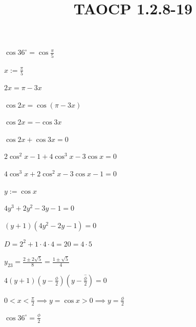 \documentclass{article}
\title{TAOCP 1.2.8\mbox{-}19}
\begin{document}
\maketitle

\( \cos 36^\circ = \cos\frac{\pi}{5} \)

\( x := \frac{\pi}{5} \)

\( 2x = \pi - 3x \)

\( \cos{2x} = \cos(\pi - 3x) \)

\( \cos{2x} = -\cos{3x} \)

\( \cos{2x} + \cos{3x} = 0 \)

\( 2\cos^{2}x - 1 + 4\cos^{3}x-3\cos x = 0 \)

\( 4\cos^{3}x+2\cos^{2}x-3\cos x-1=0 \)

\( y := \cos x \)

\( 4y^{3}+2y^{2}-3y-1=0 \)

\( (y+1)(4y^{2}-2y-1)=0 \)

\( D = 2^{2}+1\cdot4\cdot 4=20=4\cdot5 \)

\( y_{23}=\frac{2\pm 2\sqrt{5}}{8} = \frac{1\pm\sqrt{5}}{4} \)

\( 4(y+1)(y-\frac{\phi}{2})(y-\frac{\hat\phi}{2}) = 0 \)

\( 0 < x < \frac{\pi}{2} \implies y = \cos x > 0 \implies y = \frac{\phi}{2} \)

\( \cos 36^\circ = \frac{\phi}{2} \)
\end{document}
